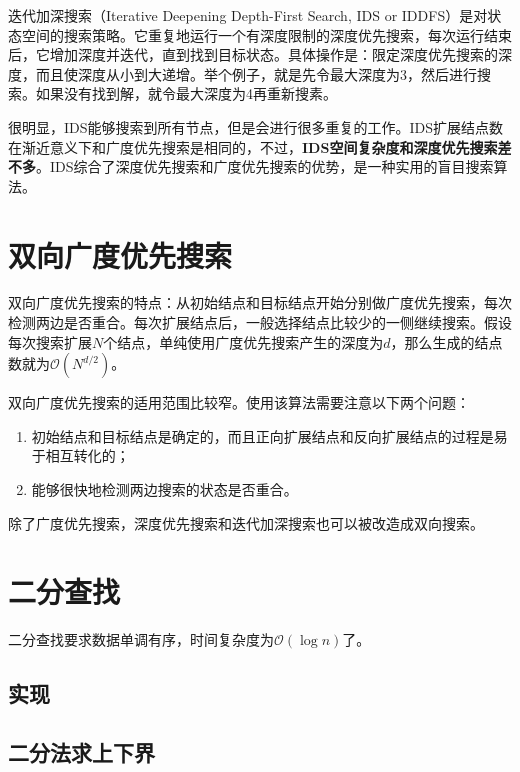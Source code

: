 迭代加深搜索（Iterative Deepening Depth-First Search, IDS or IDDFS）是对状态空间的搜索策略。它重复地运行一个有深度限制的深度优先搜索，每次运行结束后，它增加深度并迭代，直到找到目标状态。具体操作是：限定深度优先搜索的深度，而且使深度从小到大递增。举个例子，就是先令最大深度为3，然后进行搜索。如果没有找到解，就令最大深度为4再重新搜素。

很明显，IDS能够搜索到所有节点，但是会进行很多重复的工作。IDS扩展结点数在渐近意义下和广度优先搜索是相同的，不过，\textbf{IDS空间复杂度和深度优先搜索差不多}。IDS综合了深度优先搜索和广度优先搜索的优势，是一种实用的盲目搜索算法。



\section{双向广度优先搜索}

双向广度优先搜索的特点：从初始结点和目标结点开始分别做广度优先搜索，每次检测两边是否重合。每次扩展结点后，一般选择结点比较少的一侧继续搜索。假设每次搜索扩展$N$个结点，单纯使用广度优先搜索产生的深度为$d$，那么生成的结点数就为$\mathcal{O}(N^{d/2})$。

双向广度优先搜索的适用范围比较窄。使用该算法需要注意以下两个问题：

\begin{enumerate}
  \item 初始结点和目标结点是确定的，而且正向扩展结点和反向扩展结点的过程是易于相互转化的；
  \item 能够很快地检测两边搜索的状态是否重合。
\end{enumerate}

除了广度优先搜索，深度优先搜索和迭代加深搜索也可以被改造成双向搜索。



\section{二分查找}

二分查找要求数据单调有序，时间复杂度为$\mathcal{O}(\log n)$了。

\subsection{实现}


\subsection{二分法求上下界}

